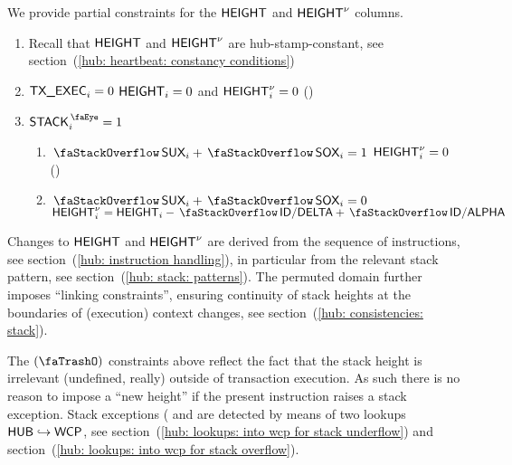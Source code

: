 We provide partial constraints for the $\textsf{HEIGHT}$ and $\textsf{HEIGHT}^{\nu}$ columns.
\begin{enumerate}
	\item Recall that $\textsf{HEIGHT}$ and $\textsf{HEIGHT}^{\nu}$ are hub-stamp-constant, see section~(\ref{hub: heartbeat: constancy conditions})
	\item \If $\textsf{TX}\textsf{\_EXEC}_{i} = 0$ \Then $\textsf{HEIGHT}_{i} = 0$ and $\textsf{HEIGHT}^{\nu} _{i} = 0$ \quad (\trash)
	\item \If $\peekStack _{i} = 1$ \Then
		\begin{enumerate}
			\item \If $\stackSux _{i} + \stackSox _{i} = 1$ \Then $\textsf{HEIGHT}^{\nu} _{i} = 0$ \quad (\trash)
		        \item \If $\stackSux _{i} + \stackSox _{i} = 0$ \Then $\height\new _{i} = \height_{i} - \stackDelta + \stackAlpha$
		\end{enumerate}
\end{enumerate}
Changes to $\textsf{HEIGHT}$ and $\textsf{HEIGHT}^{\nu}$ are derived from the sequence of instructions, see
section~(\ref{hub: instruction handling}),
in particular from the relevant stack pattern, see
section~(\ref{hub: stack: patterns}).
The permuted domain further imposes ``linking constraints'', ensuring continuity of stack heights at the boundaries of (execution) context changes, see section~(\ref{hub: consistencies: stack}).

\saNote{}
The $(\trash)$ constraints above reflect the fact that the stack height is irrelevant (undefined, really) outside of transaction execution.
As such there is no reason to impose a ``new height'' if the present instruction raises a stack exception.
Stack exceptions (\suxSH{} and \soxSH{} are detected by means of two lookups $\textsf{HUB}\hookrightarrow\textsf{WCP}$, see
section~(\ref{hub: lookups: into wcp for stack underflow}) and
section~(\ref{hub: lookups: into wcp for stack overflow}).
